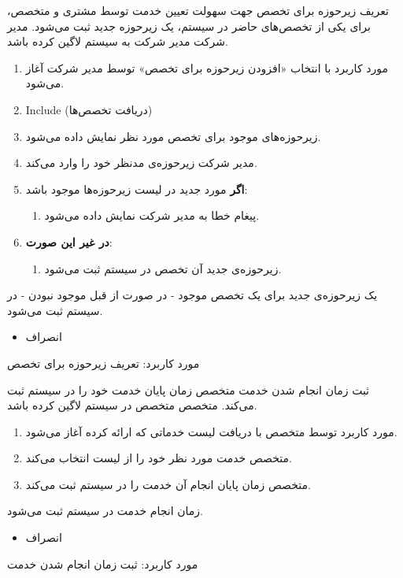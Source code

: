\usecase
{تعریف زیرحوزه برای تخصص}
{}
{جهت سهولت تعیین خدمت توسط مشتری و متخصص، برای یکی از تخصص‌های حاضر در سیستم، یک زیرحوزه جدید ثبت می‌شود.}
{مدیر شرکت}
{}
{مدیر شرکت به سیستم لاگین کرده باشد.}
{
	\vspace*{-0.6cm}
	\begin{enumerate}
		\item 
		مورد کاربرد با انتخاب «افزودن زیرحوزه برای تخصص» توسط مدیر شرکت آغاز می‌شود.
		\item Include (دریافت تخصص‌ها)
		\item زیرحوزه‌های موجود برای تخصص مورد نظر نمایش داده می‌شود.
		\item مدیر شرکت زیرحوزه‌ی مدنظر خود را وارد می‌کند. 
		\item
		\textbf{اگر}
		مورد جدید در لیست زیرحوزه‌ها موجود باشد:
		\begin{enumerate}[label=\theenumi.\arabic*.]
			\item پیغام خطا به مدیر شرکت نمایش داده می‌شود.
		\end{enumerate}
		\item
		\textbf{در غیر این صورت}:
		\begin{enumerate}[label=\theenumi.\arabic*.]
			\item زیرحوزه‌ی جدید آن تخصص در سیستم ثبت می‌شود.
		\end{enumerate}		
	\end{enumerate}
}
{یک زیرحوزه‌ی جدید برای یک تخصص موجود - در صورت از قبل موجود نبودن - در سیستم ثبت می‌شود.}
{
	\begin{itemize}
		\vspace*{-0.6cm}
		\item انصراف
	\end{itemize}
}
{
	مورد کاربرد: تعریف زیرحوزه برای تخصص
}


\usecase
{ثبت زمان انجام شدن خدمت}
{}
{متخصص زمان پایان خدمت خود را در سیستم ثبت می‌کند.}
{متخصص}
{}
{متخصص در سیستم لاگین کرده باشد.}
{
	\vspace*{-0.6cm}
	\begin{enumerate}
		\item مورد کاربرد توسط متخصص با دریافت لیست خدماتی که ارائه کرده آغاز می‌شود.
		\item متخصص خدمت مورد نظر خود را از لیست انتخاب می‌کند.
		\item متخصص زمان پایان انجام آن خدمت را در سیستم ثبت می‌کند.
	\end{enumerate}
}
{زمان انجام خدمت در سیستم ثبت می‌شود.}
{
	\begin{itemize}
		\vspace*{-0.6cm}
		\item انصراف
	\end{itemize}
}
{
	مورد کاربرد: ثبت زمان انجام شدن خدمت
}

